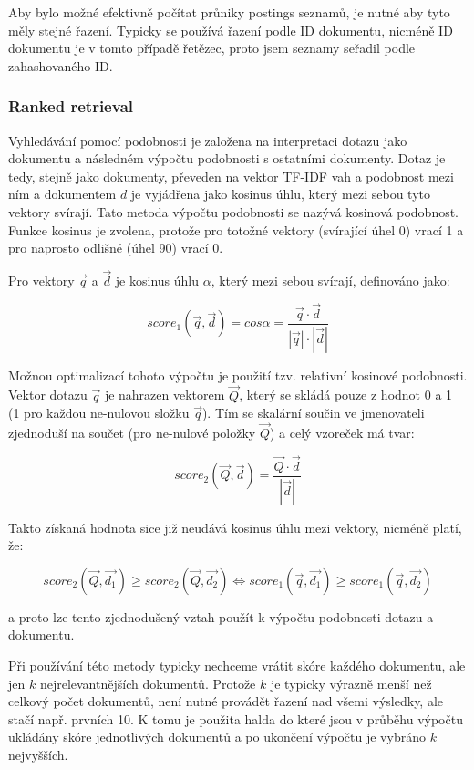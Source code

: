 \documentclass[11pt,a4paper]{scrartcl}
\begin{document}
	Aby bylo možné efektivně počítat průniky postings seznamů, je nutné aby tyto měly stejné řazení. Typicky se používá řazení podle ID dokumentu, nicméně ID dokumentu je v tomto případě řetězec, proto jsem seznamy seřadil podle zahashovaného ID.
	
	\subsubsection{Ranked retrieval}
	Vyhledávání pomocí podobnosti je založena na interpretaci dotazu jako dokumentu a následném výpočtu podobnosti s ostatními dokumenty. Dotaz je tedy, stejně jako dokumenty, převeden na vektor TF-IDF vah a podobnost mezi ním a dokumentem $d$ je vyjádřena jako kosinus úhlu, který mezi sebou tyto vektory svírají. Tato metoda výpočtu podobnosti se nazývá kosinová podobnost. Funkce kosinus je zvolena, protože pro totožné vektory (svírající úhel 0\degree) vrací 1 a pro naprosto odlišné (úhel 90\degree) vrací 0.
	
	Pro vektory $\vec{q}$ a $\vec{d}$ je kosinus úhlu $\alpha$, který mezi sebou svírají, definováno jako:
	
	\begin{equation}
		score_1(\vec{q}, \vec{d}) = cos \alpha = \frac{\vec{q} \cdot \vec{d}}{|\vec{q}| \cdot |\vec{d}|}
	\end{equation}
	
	Možnou optimalizací tohoto výpočtu je použití tzv. relativní kosinové podobnosti. Vektor dotazu $\vec{q}$ je nahrazen vektorem $\vec{Q}$, který se skládá pouze z hodnot 0 a 1 (1 pro každou ne-nulovou složku $\vec{q}$). Tím se skalární součin ve jmenovateli zjednoduší na součet (pro ne-nulové položky $\vec{Q}$) a celý vzoreček má tvar:
	
	\begin{equation}
		score_2(\vec{Q},\vec{d}) = \frac{\vec{Q} \cdot \vec{d}}{|\vec{d}|}
	\end{equation}
	
	Takto získaná hodnota sice již neudává kosinus úhlu mezi vektory, nicméně platí, že:
	
	\begin{equation}
		score_2(\vec{Q}, \vec{d_1}) \ge score_2(\vec{Q}, \vec{d_2}) \Leftrightarrow score_1(\vec{q}, \vec{d_1}) \ge score_1(\vec{q}, \vec{d_2})
	\end{equation}
	
	a proto lze tento zjednodušený vztah použít k výpočtu podobnosti dotazu a dokumentu.
	
	Při používání této metody typicky nechceme vrátit skóre každého dokumentu, ale jen $k$ nejrelevantnějších dokumentů. Protože $k$ je typicky výrazně menší než celkový počet dokumentů, není nutné provádět řazení nad všemi výsledky, ale stačí např. prvních 10. K tomu je použita halda do které jsou v průběhu výpočtu ukládány skóre jednotlivých dokumentů a po ukončení výpočtu je vybráno $k$ nejvyšších.
	
\end{document}
